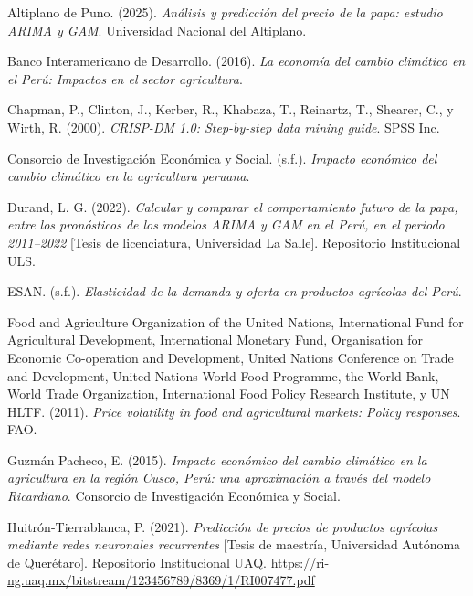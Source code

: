 \documentclass[12pt, a4paper]{report}
\begin{document}
\clearpage
\renewcommand{\bibname}{Referencias Bibliográficas}
\begin{singlespacing}

Altiplano de Puno. (2025). \textit{Análisis y predicción del precio de la papa: estudio ARIMA y GAM}. Universidad Nacional del Altiplano.

\bigskip\noindent
Banco Interamericano de Desarrollo. (2016). \textit{La economía del cambio climático en el Perú: Impactos en el sector agricultura}.

\bigskip\noindent
Chapman, P., Clinton, J., Kerber, R., Khabaza, T., Reinartz, T., Shearer, C., y Wirth, R. (2000).
\textit{CRISP-DM 1.0: Step-by-step data mining guide}. SPSS Inc.

\bigskip\noindent
Consorcio de Investigación Económica y Social. (s.f.). \textit{Impacto económico del cambio climático en la agricultura peruana}.

\bigskip\noindent
Durand, L. G. (2022). \textit{Calcular y comparar el comportamiento futuro de la papa,
entre los pronósticos de los modelos ARIMA y GAM en el Perú, en el periodo
2011–2022} [Tesis de licenciatura, Universidad La Salle]. Repositorio Institucional ULS.

\bigskip\noindent
ESAN. (s.f.). \textit{Elasticidad de la demanda y oferta en productos agrícolas del Perú}.

\bigskip\noindent
Food and Agriculture Organization of the United Nations, International Fund for Agricultural Development, International Monetary Fund, Organisation for Economic Co-operation and Development, United Nations Conference on Trade and Development, United Nations World Food Programme, the World Bank, World Trade Organization, International Food Policy Research Institute, y UN HLTF. (2011). \textit{Price volatility in food and agricultural markets: Policy responses}. FAO.

\bigskip\noindent
Guzmán Pacheco, E. (2015). \textit{Impacto económico del cambio climático en la agricultura en la región Cusco, Perú: una aproximación a través del modelo Ricardiano}. Consorcio de Investigación Económica y Social.

\bigskip\noindent
Huitrón-Tierrablanca, P. (2021). \textit{Predicción de precios de productos agrícolas mediante redes neuronales recurrentes} [Tesis de maestría, Universidad Autónoma de Querétaro]. Repositorio Institucional UAQ. \url{https://ri-ng.uaq.mx/bitstream/123456789/8369/1/RI007477.pdf}


\end{singlespacing}
\end{document}
